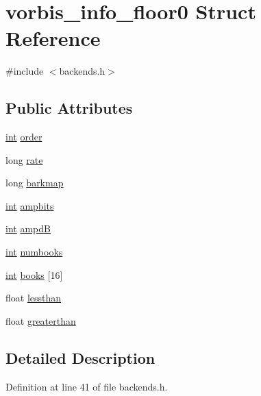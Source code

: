 \hypertarget{structvorbis__info__floor0}{}\section{vorbis\+\_\+info\+\_\+floor0 Struct Reference}
\label{structvorbis__info__floor0}


{\ttfamily \#include $<$backends.\+h$>$}

\subsection*{Public Attributes}
\begin{DoxyCompactItemize}
\item 
\hyperlink{xmltok_8h_a5a0d4a5641ce434f1d23533f2b2e6653}{int} \hyperlink{structvorbis__info__floor0_a84d5b9c9a1c85caeb2cdd57992d8489d}{order}
\item 
long \hyperlink{structvorbis__info__floor0_aec574189f1a7b44076c006e60f033160}{rate}
\item 
long \hyperlink{structvorbis__info__floor0_aa0ee524de27bf41fadb08d075ac65265}{barkmap}
\item 
\hyperlink{xmltok_8h_a5a0d4a5641ce434f1d23533f2b2e6653}{int} \hyperlink{structvorbis__info__floor0_a01f2bbcabd4a1d82a3466598ded6ab67}{ampbits}
\item 
\hyperlink{xmltok_8h_a5a0d4a5641ce434f1d23533f2b2e6653}{int} \hyperlink{structvorbis__info__floor0_a1896fee756462b4168a7c89b0514ef2e}{ampdB}
\item 
\hyperlink{xmltok_8h_a5a0d4a5641ce434f1d23533f2b2e6653}{int} \hyperlink{structvorbis__info__floor0_ae0b77b1ba0cc2cb5f3b5731758817540}{numbooks}
\item 
\hyperlink{xmltok_8h_a5a0d4a5641ce434f1d23533f2b2e6653}{int} \hyperlink{structvorbis__info__floor0_a0f726482143e32b7bfcfea3851e42247}{books} \mbox{[}16\mbox{]}
\item 
float \hyperlink{structvorbis__info__floor0_ad2bb0e03d446f4058d5c73a317216876}{lessthan}
\item 
float \hyperlink{structvorbis__info__floor0_a0c56a9e6c934a2d03c4755ca7f3e5de4}{greaterthan}
\end{DoxyCompactItemize}


\subsection{Detailed Description}


Definition at line 41 of file backends.\+h.




